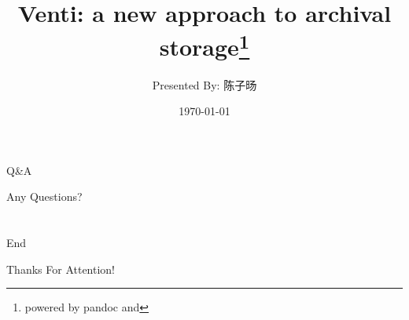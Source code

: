 \documentclass[mathserif]{beamer}
\title[Venti]{Venti: a new approach to archival storage\thanks{powered by pandoc and \XeLaTeX}}
\author{Presented By: 陈子旸}
\institute[FDU]
{
	Fudan University\\
	\medskip
	\textit{13307130148@fudan.edu.cn}
}
\date{\today}
\begin{document}
\newtheorem{property}[theorem]{\textsc{Property}}
\newtheorem{defination}[theorem]{\textsc{Defination}}
\newtheorem{theore}[theorem]{\textsc{Theorem}}
\newtheorem{lemm}[theorem]{\textsc{Lemma}}

\begin{frame}
\titlepage
\end{frame}




\AtBeginSection{}

\section[Q\&{}A]{}
\begin{frame}{Q\&{}A}
\begin{center}
  \color{blue}\huge{Any Questions?}
\end{center}
\end{frame}

\section[End]{}
\begin{frame}{End}
\begin{center}
  \color{blue}\huge{Thanks For Attention!}
\end{center}
\end{frame}
\end{document}
